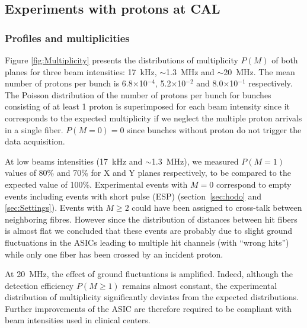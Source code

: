 \documentclass[a4paper,11pt]{article}
\begin{document}
\subsection{Experiments with protons at CAL}
\subsubsection{Profiles and multiplicities}
\label{Profiles_And_Multiplies}

Figure \ref{fig:Multiplicity} presents the distributions of multiplicity $P(M)$ of both planes for three beam intensities: 17~kHz, $\sim$1.3~MHz and $\sim$20~MHz. The mean number of protons per bunch is 6.8$\times$10$^{-4}$, 5.2$\times$10$^{-2}$ and 8.0$\times$10$^{-1}$ respectively. The Poisson distribution of the number of protons per bunch for bunches consisting of at least 1 proton is superimposed for each beam intensity since it corresponds to the expected multiplicity if we neglect the multiple proton arrivals in a single fiber. $P(M=0)=0$ since bunches without proton do not trigger the data acquisition. 

At low beams intensities (17~kHz and $\sim$1.3~MHz), we measured $P(M=1)$ values of 80\% and 70\% for X and Y planes respectively, to be compared to the expected value of 100\%. Experimental events with $M=0$ correspond to empty events including events with short pulse (ESP) (section~\ref{sec:hodo} and \ref{sec:Settings}). Events with $M\ge2$ could have been assigned to cross-talk between neighboring fibres. However since the distribution of distances between hit fibers is almost flat we concluded that these events are probably due to slight ground fluctuations in the ASICs leading to multiple hit channels (with “wrong hits”) while only one fiber has been crossed by an incident proton. 

At 20~MHz, the effect of ground fluctuations is amplified. Indeed, although the detection efficiency $P(M\ge1)$ remains almost constant, the experimental distribution of multiplicity significantly deviates from the expected distributions. Further improvements of the ASIC are therefore required to be compliant with beam intensities used in clinical centers.
\end{document}
